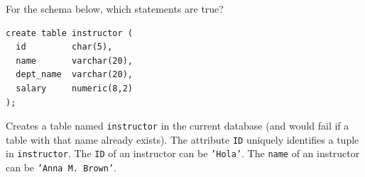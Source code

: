 \documentclass[12pt]{exam}
\begin{document}
\begin{questions}
\begin{checkboxes}
\end{checkboxes}


\question[4] For the schema below, which statements are true?
\begin{verbatim}
create table instructor (
  id         char(5),
  name       varchar(20),
  dept_name  varchar(20),
  salary     numeric(8,2)
);
\end{verbatim}
\begin{checkboxes}
  \CorrectChoice Creates a table named \texttt{instructor} in the current database (and would fail if a table with that name already exists).
  \choice The attribute \texttt{ID} uniquely identifies a tuple in \texttt{instructor}.
  \CorrectChoice The \texttt{ID} of an instructor can be \texttt{'Hola'}.
  \CorrectChoice The \texttt{name} of an instructor can be \texttt{'Anna M. Brown'}.
\end{checkboxes}

\end{questions}
\end{document}
